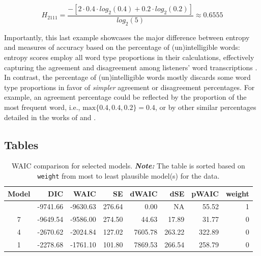 \documentclass[
  authoryear,
  preprint,
  1p]{elsarticle}
\begin{document}
\[
H_{2111} = \frac{ -\left[ 2 \cdot 0.4 \cdot log_{2}(0.4) + 0.2 \cdot log_{2}(0.2) \right] }{ log_{2}(5)} \approx 0.6555
\]

{Importantly, this last example showcases the major difference between
entropy and measures of accuracy based on the percentage of
(un)intelligible words: entropy scores employ all word type proportions
in their calculations, effectively capturing the agreement and
disagreement among listeners' word transcriptions
\citep{Boonen_et_al_2021}. In contrast, the percentage of
(un)intelligible words mostly discards some word type proportions in
favor of \emph{simpler} agreement or disagreement percentages. For
example, an agreement percentage could be reflected by the proportion of
the most frequent word, i.e., \(\text{max}\{ 0.4, 0.4, 0.2 \}=0.4\), or
by other similar percentages detailed in the works of
\citet{Flipsen_2006} and \citet{Lagerberg_et_al_2014}.}

\newpage{}

\subsection{Tables}\label{sec-appB}

\begin{longtable}[]{@{}crrrrrrr@{}}

\caption{\label{tbl-rq1-waic}WAIC comparison for selected models.
{\textbf{\emph{Note:}} The table is sorted based on \texttt{weight} from
most to least plausible model(s) for the data.}}

\tabularnewline

\toprule\noalign{}
Model & DIC & WAIC & SE & dWAIC & dSE & pWAIC & weight \\
\midrule\noalign{}
\endhead
\bottomrule\noalign{}
\endlastfoot
10 & -9741.66 & -9630.63 & 276.64 & 0.00 & NA & 55.52 & 1 \\
7 & -9649.54 & -9586.00 & 274.50 & 44.63 & 17.89 & 31.77 & 0 \\
4 & -2670.62 & -2024.84 & 127.02 & 7605.78 & 263.22 & 322.89 & 0 \\
1 & -2278.68 & -1761.10 & 101.80 & 7869.53 & 266.54 & 258.79 & 0 \\

\end{longtable}
\end{document}

